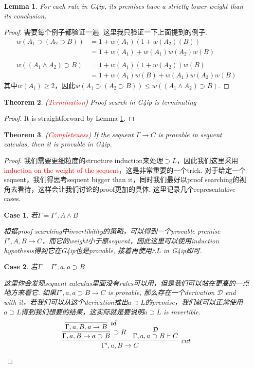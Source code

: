 \documentclass{article}
\theoremstyle{plain}
\newtheorem{theorem}{Theorem}
\newtheorem{lemma}[theorem]{Lemma}
\newcounter{case}
\newtheorem{case}{Case}
\theoremstyle{nonumberplain}
\newtheorem{proof}{Proof}
\newcommand{\redt}[1]{\textcolor{red}{#1}}
\begin{document}
\begin{lemma}\label{amazing-weight}
\rm For each rule in G4ip, its premises have a strictly lower weight than its conclusion. 
\end{lemma}

\begin{proof}
需要每个例子都验证一遍. 这里我只验证一下上面提到的例子. 
$$
\begin{aligned}
w(A_1\supset (A_2 \supset B)) &= 1 + w(A_1)(1+w(A_2)(B)) \\
&= 1 + w(A_1) + w(A_1)w(A_2)w(B)\\\\
w((A_1 \wedge A_2) \supset B) &= 1 + w(A_1)(1+w(A_2))w(B) \\
&=1 + w(A_1)w(B) + w(A_1)w(A_2)w(B)
\end{aligned}
$$
其中$w(A_1) \geq 2$，因此$w(A_1\supset (A_2 \supset B)) \leq w((A_1 \wedge A_2) \supset B)$.
\end{proof}

\begin{theorem}
\rm (\redt{Termination}) Proof search in G4ip is terminating
\end{theorem}

\begin{proof}
It is straightforward by Lemma \ref{amazing-weight}.
\end{proof}

\begin{theorem}
\rm (\redt{Completeness}) If the sequent $\Gamma \to C$ is provable in sequent calculus, then it is provable in G4ip.
\end{theorem}


\begin{proof}
\rm 我们需要更细粒度的structure induction来处理$\supset L$，因此我们这里采用\redt{induction on the weight of the sequent}，这是非常重要的一个trick. 对于给定一个sequent，我们得思考sequent bigger than it，同时我们最好以proof searching的视角去看待，这样会让我们讨论的proof更加的具体. 这里记录几个representative cases. 
\begin{case}
若$\Gamma = \Gamma', A \wedge B$

根据proof searching中invertibility的策略，可以得到一个provable premise $\Gamma', A, B \to C$，而它的weight小于原sequent，因此这里可以使用induction hypothesis得到它在G4ip也是provable, 接着再使用$\wedge L$ in G4ip即可.
\end{case}
\begin{case}
若$\Gamma = \Gamma', a, a\supset B$

这里你会发现sequent calculus里面没有rules可以用，但是我们可以站在更高的一点地方来看它. 如果$\Gamma', a, a \supset B \to C$ is provable, 那么存在一个derivation $\mathcal{D}$ end with it，若我们可以从这个derivation推出$a \supset L$的premise，我们就可以正常使用$a \supset L$得到我们想要的结果，这实际就是要说明$a \supset L$ is invertible. 
$$
\infer[cut]{\Gamma',a, B \to C}{\infer[\supset R]{\Gamma,a,B \to a \supset B}{\infer[id]{\Gamma,a,B,a \to B}{}} & \deduce{\Gamma, a, a\supset B \vdash C}{\mathcal{D}}}
$$
\end{case}
\end{proof}
\end{document}
